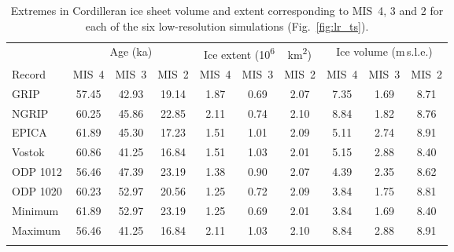 \documentclass[tc, manuscript]{copernicus}
\begin{document}
\begin{table}
\caption{%
      Extremes in Cordilleran ice sheet volume and extent corresponding to
      MIS~4, 3 and 2 for each of the six low-resolution simulations
      (Fig.~\ref{fig:lr_ts}).}
\label{tab:extrema}
  {
{\begin{tabular}{l|ccc|ccc|ccc}
    \tophline
             & \multicolumn{3}{c|}{Age (ka)}
             & \multicolumn{3}{c|}{Ice extent (\unit{10^6\,km^2})}
             & \multicolumn{3}{c}{Ice volume (m\,s.l.e.)} \\
    Record   &  MIS~4 &  MIS~3 &  MIS~2
             &  MIS~4 &  MIS~3 &  MIS~2
             &  MIS~4 &  MIS~3 &  MIS~2 \\
    \middlehline
    GRIP     &  57.45 &  42.93 &  19.14
             &   1.87 &   0.69 &   2.07
             &   7.35 &   1.69 &   8.71 \\
    NGRIP    &  60.25 &  45.86 &  22.85
             &   2.11 &   0.74 &   2.10
             &   8.84 &   1.82 &   8.76 \\
    EPICA    &  61.89 &  45.30 &  17.23
             &   1.51 &   1.01 &   2.09
             &   5.11 &   2.74 &   8.91 \\
    Vostok   &  60.86 &  41.25 &  16.84
             &   1.51 &   1.03 &   2.01
             &   5.15 &   2.88 &   8.40 \\
    ODP 1012 &  56.46 &  47.39 &  23.19
             &   1.38 &   0.90 &   2.07
             &   4.39 &   2.35 &   8.62 \\
    ODP 1020 &  60.23 &  52.97 &  20.56
             &   1.25 &   0.72 &   2.09
             &   3.84 &   1.75 &   8.81 \\
    \cline{1-10}
    Minimum  &  61.89 &  52.97 &  23.19
             &   1.25 &   0.69 &   2.01
             &   3.84 &   1.69 &   8.40 \\
    Maximum  &  56.46 &  41.25 &  16.84
             &   2.11 &   1.03 &   2.10
             &   8.84 &   2.88 &   8.91 \\
    \bottomhline
\end{tabular}}}
\end{table}
\end{document}
